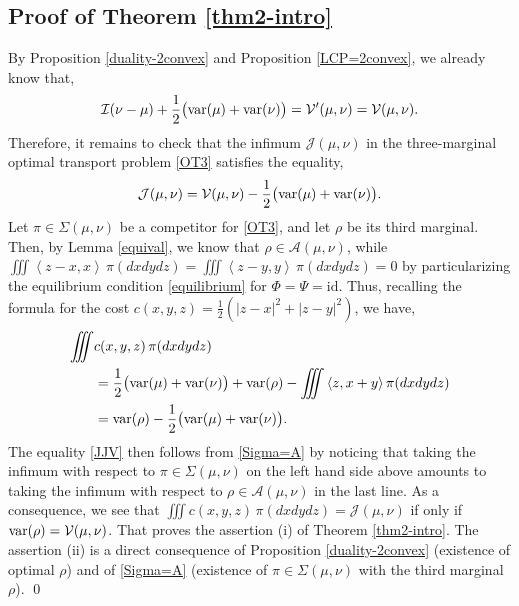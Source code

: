 \documentclass[11pt,letterpaper,reqno]{amsart}
\theoremstyle{definition}
\numberwithin{equation}{section}
\newcommand{\ident}{{\mathrm{id}}}
\newcommand{\A}{\mathcal{A}}
\newcommand{\JJ}{\mathcal{J}}
\newcommand{\var}{{\rm{var}}}
\newcommand{\pairing}[1]{{\left \langle #1 \right \rangle}}
\newcommand{\I}{\mathcal{I}}
\newcommand{\V}{{\mathcal{V}}}
\begin{document}
{\subsection{Proof of Theorem \ref{thm2-intro}}
  By Proposition \ref{duality-2convex} and 
Proposition \ref{LCP=2convex}, we already know that,
$$ \I(\nu-\mu) + \frac1{2} \big(\var(\mu)+\var(\nu)\big) =\V'(\mu,\nu)  = \V(\mu,\nu).$$    
Therefore,  it remains  to check that the infimum $\JJ(\mu,\nu)$ in the three-marginal optimal transport  problem \eqref{OT3} satisfies
the equality,
\begin{equation}\label{JJV}
\JJ(\mu,\nu) = \V(\mu,\nu) - \frac1{2} \big(\var(\mu)+\var(\nu)\big) .
\end{equation}
Let $\pi\in \Sigma(\mu,\nu)$ be  a competitor for  \eqref{OT3}, and let $\rho$ be its third marginal. Then, by Lemma \ref{equival},
we know that $\rho\in\A(\mu,\nu)$,  while $ \iiint  \pairing{z-x, x} \, \pi(dxdydz)=\iiint \pairing{z-y, y} \,  \pi(dxdydz) =0$
by particularizing the equilibrium condition  \eqref{equilibrium} for $\Phi= \Psi= \ident$. Thus, recalling the formula for the cost $c(x,y,z)=\frac1{2} (|z-x|^2 + |z-y|^2)$, we have,
\begin{align*}  \iiint& c(x,y,z) \, \pi(dxdydz)\\
	&= \frac1{2} \big(\var(\mu)+\var(\nu)\big) + \var(\rho) -\iiint  \pairing {z,x+y}\, \pi(dxdydz) \\
&=      \var(\rho)- \frac1{2} \big(\var(\mu)+\var(\nu)\big) .
\end{align*} 
The equality \eqref{JJV} then follows from \eqref{Sigma=A} by noticing that  taking the infimum with respect to $\pi\in \Sigma(\mu,\nu)$ on the left hand side above amounts to taking the infimum with respect to $\rho\in\A(\mu,\nu)$ in the last line. 
As a consequence, we see that   $\iiint c(x,y,z) \, \pi(dxdydz) = \JJ(\mu,\nu)$ if only if  $\var(\rho) =\V(\mu,\nu)$.
That proves the assertion  (i) of Theorem \ref{thm2-intro}. The assertion (ii) is a direct consequence of Proposition \ref{duality-2convex} (existence of optimal $\rho$) and of \eqref{Sigma=A} (existence of $\pi\in \Sigma(\mu,\nu)$
with the third marginal $\rho$).  
\qed







}
\end{document}
